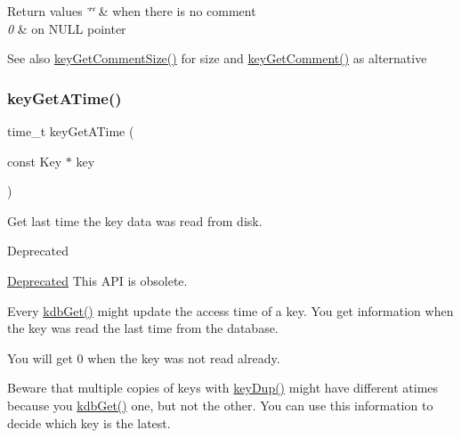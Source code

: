 \begin{DoxyRetVals}{Return values}
{\em \char`\"{}\char`\"{}} & when there is no comment \\
\hline
{\em 0} & on N\+U\+LL pointer \\
\hline
\end{DoxyRetVals}
\begin{DoxySeeAlso}{See also}
\hyperlink{group__meta_ga0dd737fadc16d4cf16720d17f066a9d3}{key\+Get\+Comment\+Size()} for size and \hyperlink{group__meta_gafb89735689929ff717cc9f2d0d0b46a2}{key\+Get\+Comment()} as alternative 
\end{DoxySeeAlso}
\mbox{\label{group__meta_ga6b05da399c3c78904969ef39f191b0eb}} 
\subsubsection{\texorpdfstring{key\+Get\+A\+Time()}{keyGetATime()}}
{\footnotesize\ttfamily time\+\_\+t key\+Get\+A\+Time (\begin{DoxyParamCaption}\item[{const Key $\ast$}]{key }\end{DoxyParamCaption})}



Get last time the key data was read from disk. 

\begin{DoxyRefDesc}{Deprecated}
\item[\hyperlink{deprecated__deprecated000021}{Deprecated}]This A\+PI is obsolete.\end{DoxyRefDesc}


Every \hyperlink{group__kdb_ga28e385fd9cb7ccfe0b2f1ed2f62453a1}{kdb\+Get()} might update the access time of a key. You get information when the key was read the last time from the database.

You will get 0 when the key was not read already.

Beware that multiple copies of keys with \hyperlink{group__key_gae6ec6a60cc4b8c1463fa08623d056ce3}{key\+Dup()} might have different atimes because you \hyperlink{group__kdb_ga28e385fd9cb7ccfe0b2f1ed2f62453a1}{kdb\+Get()} one, but not the other. You can use this information to decide which key is the latest.


